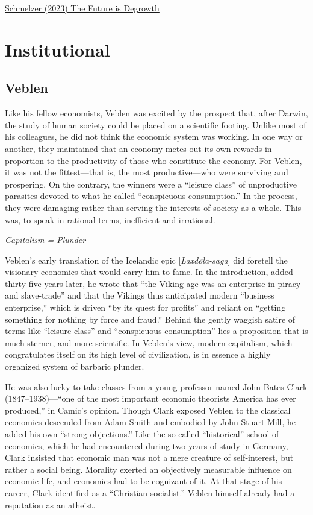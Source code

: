 \documentclass[
]{book}
\begin{document}
\href{https://www.versobooks.com/books/3989-the-future-is-degrowth}{Schmelzer (2023) The Future is Degrowth}

\hypertarget{institutional}{%
\chapter{Institutional}\label{institutional}}

\hypertarget{veblen}{%
\section{Veblen}\label{veblen}}

Like his fellow economists, Veblen was excited by the prospect that, after Darwin, the study of human society could be placed on a scientific footing. Unlike most of his colleagues, he did not think the economic system was working. In one way or another, they maintained that an economy metes out its own rewards in proportion to the productivity of those who constitute the economy. For Veblen, it was not the fittest---that is, the most productive---who were surviving and prospering. On the contrary, the winners were a ``leisure class'' of unproductive parasites devoted to what he called ``conspicuous consumption.'' In the process, they were damaging rather than serving the interests of society as a whole. This was, to speak in rational terms, inefficient and irrational.

\emph{Capitalism = Plunder}

Veblen's early translation of the Icelandic epic {[}\emph{Laxdøla-saga}{]} did foretell the visionary economics that would carry him to fame. In the introduction, added thirty-five years later, he wrote that ``the Viking age was an enterprise in piracy and slave-trade'' and that the Vikings thus anticipated modern ``business enterprise,'' which is driven ``by its quest for profits'' and reliant on ``getting something for nothing by force and fraud.'' Behind the gently waggish satire of terms like ``leisure class'' and ``conspicuous consumption'' lies a proposition that is much sterner, and more scientific. In Veblen's view, modern capitalism, which congratulates itself on its high level of civilization, is in essence a highly organized system of barbaric plunder.

He was also lucky to take classes from a young professor named John Bates Clark (1847--1938)---``one of the most important economic theorists America has ever produced,'' in Camic's opinion. Though Clark exposed Veblen to the classical economics descended from Adam Smith and embodied by John Stuart Mill, he added his own ``strong objections.'' Like the so-called ``historical'' school of economics, which he had encountered during two years of study in Germany, Clark insisted that economic man was not a mere creature of self-interest, but rather a social being. Morality exerted an objectively measurable influence on economic life, and economics had to be cognizant of it. At that stage of his career, Clark identified as a ``Christian socialist.'' Veblen himself already had a reputation as an atheist.
\end{document}
